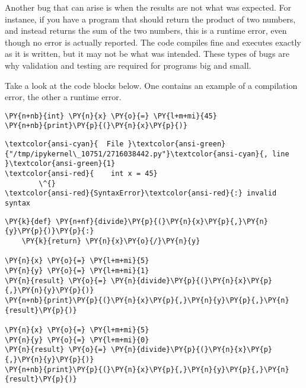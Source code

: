 Another bug that can arise is when the results are not what was
expected. For instance, if you have a program that should return the
product of two numbers, and instead returns the sum of the two numbers,
this is a runtime error, even though no error is actually reported. The
code compiles fine and executes exactly as it is written, but it may not
be what was intended. These types of bugs are why validation and testing
are required for programs big and small.

Take a look at the code blocks below. One contains an example of a
compilation error, the other a runtime error.

    \begin{tcolorbox}[breakable, size=fbox, boxrule=1pt, pad at break*=1mm,colback=cellbackground, colframe=cellborder]
\begin{Verbatim}[commandchars=\\\{\}]
\PY{n+nb}{int} \PY{n}{x} \PY{o}{=} \PY{l+m+mi}{45}
\PY{n+nb}{print}\PY{p}{(}\PY{n}{x}\PY{p}{)}
\end{Verbatim}
\end{tcolorbox}

    \begin{Verbatim}[commandchars=\\\{\}, frame=single, framerule=2mm, rulecolor=\color{outerrorbackground}]
\textcolor{ansi-cyan}{  File }\textcolor{ansi-green}{"/tmp/ipykernel\_10751/2716038442.py"}\textcolor{ansi-cyan}{, line }\textcolor{ansi-green}{1}
\textcolor{ansi-red}{    int x = 45}
        \^{}
\textcolor{ansi-red}{SyntaxError}\textcolor{ansi-red}{:} invalid syntax

    \end{Verbatim}

    \begin{tcolorbox}[breakable, size=fbox, boxrule=1pt, pad at break*=1mm,colback=cellbackground, colframe=cellborder]
\begin{Verbatim}[commandchars=\\\{\}]
\PY{k}{def} \PY{n+nf}{divide}\PY{p}{(}\PY{n}{x}\PY{p}{,}\PY{n}{y}\PY{p}{)}\PY{p}{:}
    \PY{k}{return} \PY{n}{x}\PY{o}{/}\PY{n}{y}

\PY{n}{x} \PY{o}{=} \PY{l+m+mi}{5}
\PY{n}{y} \PY{o}{=} \PY{l+m+mi}{1}
\PY{n}{result} \PY{o}{=} \PY{n}{divide}\PY{p}{(}\PY{n}{x}\PY{p}{,}\PY{n}{y}\PY{p}{)}
\PY{n+nb}{print}\PY{p}{(}\PY{n}{x}\PY{p}{,}\PY{n}{y}\PY{p}{,}\PY{n}{result}\PY{p}{)}

\PY{n}{x} \PY{o}{=} \PY{l+m+mi}{5}
\PY{n}{y} \PY{o}{=} \PY{l+m+mi}{0}
\PY{n}{result} \PY{o}{=} \PY{n}{divide}\PY{p}{(}\PY{n}{x}\PY{p}{,}\PY{n}{y}\PY{p}{)}
\PY{n+nb}{print}\PY{p}{(}\PY{n}{x}\PY{p}{,}\PY{n}{y}\PY{p}{,}\PY{n}{result}\PY{p}{)}
\end{Verbatim}
\end{tcolorbox}

